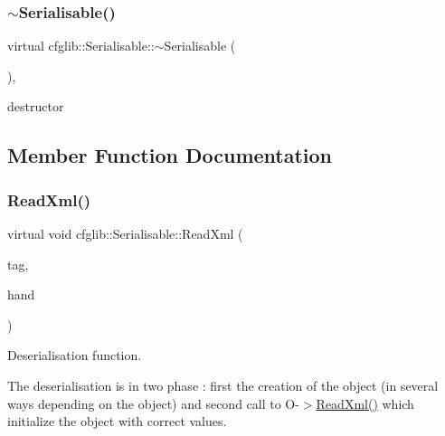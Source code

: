 \subsubsection{\texorpdfstring{$\sim$\+Serialisable()}{~Serialisable()}}
{\footnotesize\ttfamily virtual cfglib\+::\+Serialisable\+::$\sim$\+Serialisable (\begin{DoxyParamCaption}{ }\end{DoxyParamCaption})\hspace{0.3cm}{\ttfamily [inline]}, {\ttfamily [virtual]}}

destructor 

\subsection{Member Function Documentation}
\mbox{\label{classcfglib_1_1Serialisable_a876d530446317872259356af9b016e13}} 
\subsubsection{\texorpdfstring{Read\+Xml()}{ReadXml()}}
{\footnotesize\ttfamily virtual void cfglib\+::\+Serialisable\+::\+Read\+Xml (\begin{DoxyParamCaption}\item[{\hyperlink{classXmlTag}{Xml\+Tag} const $\ast$}]{tag,  }\item[{\hyperlink{classcfglib_1_1Handle}{Handle} \&}]{hand }\end{DoxyParamCaption})\hspace{0.3cm}{\ttfamily [pure virtual]}}

Deserialisation function.

The deserialisation is in two phase \+: first the creation of the object (in several ways depending on the object) and second call to O-\/$>$\hyperlink{classcfglib_1_1Serialisable_a876d530446317872259356af9b016e13}{Read\+Xml()} which initialize the object with correct values. 

